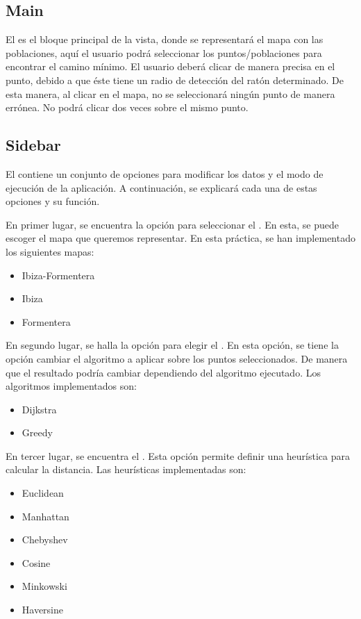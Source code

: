 \subsection{Main}

El  es el bloque principal de la vista, donde se representará el mapa con las poblaciones, aquí el usuario podrá seleccionar los puntos/poblaciones para encontrar el camino mínimo. El usuario deberá clicar de manera precisa en el punto, debido a que éste tiene un radio de detección del ratón determinado. De esta manera, al clicar en el mapa, no se seleccionará ningún punto de manera errónea. No podrá clicar dos veces sobre el mismo punto. \bigskip

\subsection{Sidebar}\label{Sidebar}

El  contiene un conjunto de opciones para modificar los datos y el modo de ejecución de la aplicación. A continuación, se explicará cada una de estas opciones y su función.\bigskip

En primer lugar, se encuentra la opción para seleccionar el . En esta, se puede escoger el mapa que queremos representar. En esta práctica, se han implementado los siguientes mapas: \bigskip

\begin{itemize}
    \item Ibiza-Formentera
    \item Ibiza
    \item Formentera
\end{itemize}
\bigskip

En segundo lugar, se halla la opción para elegir el . En esta opción, se tiene la opción cambiar el algoritmo a aplicar sobre los puntos seleccionados. De manera que el resultado podría cambiar dependiendo del algoritmo ejecutado. Los algoritmos implementados son:\bigskip

\begin{itemize}
    \item Dijkstra
    \item Greedy 
\end{itemize}
\bigskip

En tercer lugar, se encuentra el . Esta opción permite definir una heurística para calcular la distancia. Las heurísticas implementadas son:\bigskip

\begin{itemize}
    \item Euclidean
    \item Manhattan 
    \item Chebyshev
    \item Cosine
    \item Minkowski
    \item Haversine
\end{itemize}
\bigskip

